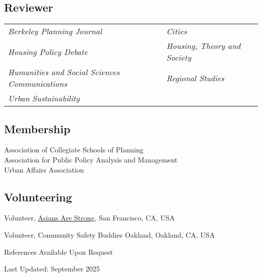 \documentclass[11pt,letterpaper]{article}
\begin{document}
\subsection{Reviewer}
\begin{tabular}{@{}p{} p{}@{}}
\emph{Berkeley Planning Journal} & \emph{Cities}\\
\emph{Housing Policy Debate} & \emph{Housing, Theory and Society}\\
\emph{Humanities and Social Sciences Communications} & \emph{Regional Studies}\\
\emph{Urban Sustainability} &
\end{tabular}

\subsection{Membership}
Association of Collegiate Schools of Planning\\
Association for Public Policy Analysis and Management\\
Urban Affairs Association

\subsection{Volunteering}
\begin{tablist}
  \item[2024–2025] \tab{}Volunteer, \href{https://asiansarestrong.org/}{Asians Are Strong}, San Francisco, CA, USA
  \item[2024–2025] \tab{}Volunteer, Community Safety Buddies Oakland, Oakland, CA, USA
\end{tablist}

\vspace{1.0\baselineskip}
{\footnotesize References Available Upon Request}\par\vspace{.5\baselineskip}
{\footnotesize Last Updated: September 2025}
\end{document}
